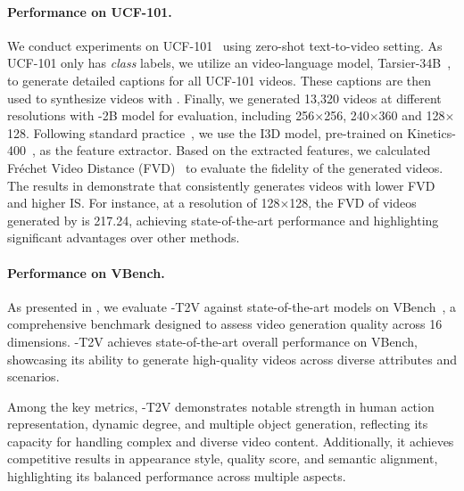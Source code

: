 \paragraph{Performance on UCF-101.} 
We conduct experiments on UCF-101~\citep{ucf101} using zero-shot text-to-video setting. As UCF-101 only has \emph{class} labels, we utilize an video-language model, Tarsier-34B~\citep{wang2024tarsier}, to generate detailed captions for all UCF-101 videos. These captions are then used to synthesize videos with \ours. Finally, we generated 13,320 videos at different resolutions with \ours-2B model for evaluation, including  256$\times$256, 240$\times$360 and 128$\times$128. Following standard practice~\citep{skorokhodov2022stylegan}, we use the I3D model, pre-trained on Kinetics-400~\citep{carreira2017quo}, as the feature extractor. Based on the extracted features, we calculated Fr\'echet Video Distance (FVD)~\citep{unterthiner2018towards} to evaluate the fidelity of the generated videos. The results in  demonstrate that \ours consistently generates videos with lower FVD and higher IS. For instance, at a resolution of 128$\times$128, the FVD of videos generated by \ours is 217.24, achieving state-of-the-art performance and highlighting significant advantages over other methods.



\paragraph{Performance on VBench.}

As presented in , we evaluate \ours-T2V against state-of-the-art models on VBench~\citep{huang2024vbench}, a comprehensive benchmark designed to assess video generation quality across 16 dimensions. \ours-T2V achieves state-of-the-art overall performance on VBench, showcasing its ability to generate high-quality videos across diverse attributes and scenarios.

Among the key metrics, \ours-T2V demonstrates notable strength in human action representation, dynamic degree, and multiple object generation, reflecting its capacity for handling complex and diverse video content. Additionally, it achieves competitive results in appearance style, quality score, and semantic alignment, highlighting its balanced performance across multiple aspects.


